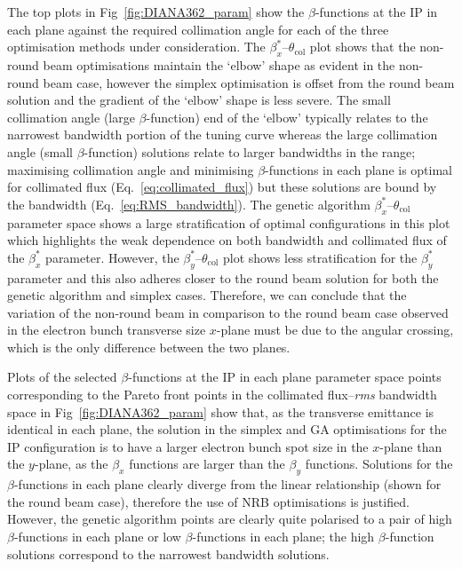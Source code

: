 \documentclass[../main.tex]{subfiles}
\begin{document}
The top plots in Fig~\ref{fig:DIANA362_param} show the $\beta$-functions at the IP in each plane against the required collimation angle for each of the three optimisation methods under consideration. The $\beta_{x}^{*}$--$\theta_{\mathrm{col}}$ plot shows that the non-round beam optimisations maintain the `elbow' shape as evident in the non-round beam case, however the simplex optimisation is offset from the round beam solution and the gradient of the `elbow' shape is less severe. The small collimation angle (large $\beta$-function) end of the `elbow' typically relates to the narrowest bandwidth portion of the tuning curve whereas the large collimation angle (small $\beta$-function) solutions relate to larger bandwidths in the range; maximising collimation angle and minimising $\beta$-functions in each plane is optimal for collimated flux (Eq.~\ref{eq:collimated_flux}) but these solutions are bound by the bandwidth (Eq.~\ref{eq:RMS_bandwidth}). The genetic algorithm $\beta_{x}^{*}$--$\theta_{\mathrm{col}}$ parameter space shows a large stratification of optimal configurations in this plot which highlights the weak dependence on both bandwidth and collimated flux of the $\beta_{x}^{*}$ parameter. However, the $\beta_{y}^{*}$--$\theta_{\mathrm{col}}$ plot shows less stratification for the $\beta_{y}^{*}$ parameter and this also adheres closer to the round beam solution for both the genetic algorithm and simplex cases. Therefore, we can conclude that the variation of the non-round beam in comparison to the round beam case observed in the electron bunch transverse size $x$-plane must be due to the angular crossing, which is the only difference between the two planes.

Plots of the selected $\beta$-functions at the IP in each plane parameter space points corresponding to the Pareto front points in the collimated flux--\textit{rms} bandwidth space in Fig~\ref{fig:DIANA362_param} show that, as the transverse emittance is identical in each plane, the solution in the simplex and GA optimisations for the IP configuration is to have a larger electron bunch spot size in the $x$-plane than the $y$-plane, as the $\beta_{x}$ functions are larger than the $\beta_{y}$ functions. Solutions for the $\beta$-functions in each plane clearly diverge from the linear relationship (shown for the round beam case), therefore the use of NRB optimisations is justified. However, the genetic algorithm points are clearly quite polarised to a pair of high $\beta$-functions in each plane or low $\beta$-functions in each plane; the high $\beta$-function solutions correspond to the narrowest bandwidth solutions.
\end{document}
